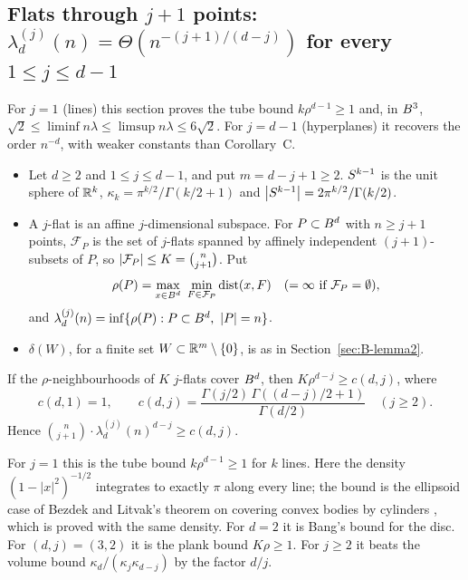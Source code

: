 \documentclass[11pt]{article}
\begin{document}
\subsection{Flats through \texorpdfstring{$j+1$}{j+1} points: \texorpdfstring{$\lambda_d^{(j)}(n)=\Theta(n^{-(j+1)/(d-j)})$}{lambda = Theta(n\textasciicircum(-(j+1)/(d-j)))} for every \texorpdfstring{$1\le j\le d-1$}{1 <= j <= d-1}}
\label{sec:D-flats}

For $j=1$ (lines) this section proves the tube bound $k\rho^{d-1}\ge1$ and, in $B^3$,
$\sqrt2\le\liminf n\lambda\le\limsup n\lambda\le6\sqrt2$. For $j=d-1$ (hyperplanes) it recovers the
order $n^{-d}$, with weaker constants than Corollary~C.

\begin{definition}\leavevmode
\begin{itemize}
  \item Let $d\ge2$ and $1\le j\le d-1$, and put $m=d-j+1\ge2$.
    $S^{k-1}$ is the unit sphere of $\mathbb{R}^k$, $\kappa_k=\pi^{k/2}/\Gamma(k/2+1)$ and
    $\left|S^{k-1}\right|=2\pi^{k/2}/\Gamma(k/2)$.
  \item A $j$-flat is an affine $j$-dimensional subspace. For $P\subset B^d$ with $n\ge j+1$
    points, $\mathcal{F}_P$ is the set of $j$-flats spanned by affinely independent
    $(j+1)$-subsets of $P$, so $\left|\mathcal{F}_P\right|\le K=\binom{n}{j+1}$. Put
    \[
      \rho(P)=\max_{x\in\ball^d}\ \min_{F\in\mathcal{F}_P}\dist(x,F)\quad(=\infty\text{ if }\mathcal{F}_P=\emptyset),
    \]
    and $\lambda_d^{(j)}(n)=\inf\{\rho(P):P\subset\ball^d,\ \abs{P}=n\}$.
  \item $\delta(W)$, for a finite set $W\subset\mathbb{R}^m\setminus\{0\}$, is as in Section~\ref{sec:B-lemma2}.
\end{itemize}
\end{definition}

\begin{proposition}\label{D:M1}
If the $\rho$-neighbourhoods of $K$ $j$-flats cover $B^d$, then $K\rho^{d-j}\ge c(d,j)$, where
\begin{equation*}
  c(d,1)=1,\qquad c(d,j)=\frac{\Gamma(j/2)\,\Gamma((d-j)/2+1)}{\Gamma(d/2)}\quad(j\ge2).
\end{equation*}
Hence $\binom{n}{j+1}\cdot\lambda_d^{(j)}(n)^{d-j}\ge c(d,j)$.
\end{proposition}

For $j=1$ this is the tube bound $k\rho^{d-1}\ge1$ for $k$ lines. Here the density $(1-|x|^2)^{-1/2}$
integrates to exactly $\pi$ along every line; the bound is the ellipsoid case of Bezdek and Litvak's theorem on
covering convex bodies by cylinders \cite[Theorem~3.1]{BL}, which is proved with the same density. For $d=2$ it is Bang's bound
for the disc. For $(d,j)=(3,2)$ it is the plank bound $K\rho\ge1$. For
$j\ge2$ it beats the volume bound $\kappa_d/(\kappa_j\kappa_{d-j})$ by the factor $d/j$.
\end{document}
